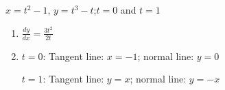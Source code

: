 {$x=t^2-1$, $y=t^3-t$;\quad $t=0$ and $t=1$}
{\begin{enumerate}
	\item $\frac{dy}{dx} = \frac{3t^2}{2 t}$
	\item	$t=0$: Tangent line: $x=-1$; normal line: $y = 0$
	
	$t=1$: Tangent line: $y=x$; normal line: $y=-x$
\end{enumerate}
}
